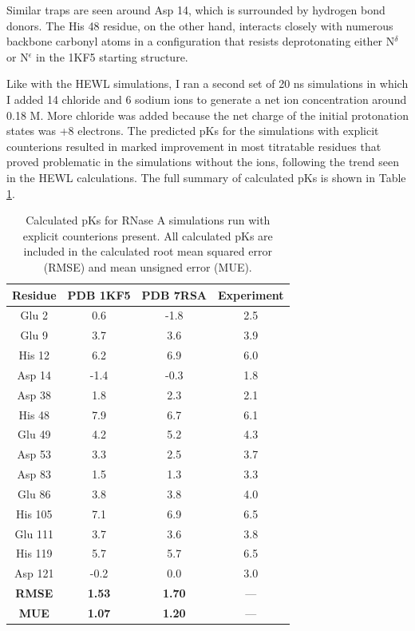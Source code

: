 Similar traps are seen around Asp 14, which is surrounded by hydrogen bond
donors. The His 48 residue, on the other hand, interacts closely with numerous
backbone carbonyl atoms in a configuration that resists deprotonating either
N$^\delta$ or N$^\epsilon$ in the 1KF5 starting structure.

Like with the HEWL simulations, I ran a second set of 20 ns simulations in
which I added 14 chloride and 6 sodium ions to generate a net ion concentration
around 0.18 M. More chloride was added because the net charge of the initial
protonation states was +8 electrons. The predicted pKs for the
simulations with explicit counterions resulted in marked improvement in most
titratable residues that proved problematic in the simulations without the ions,
following the trend seen in the HEWL calculations. The full summary of
calculated pKs is shown in Table \ref{tbl4:rnase_a_ions_pkas}.
\begin{table}
   \caption{Calculated pKs for RNase A simulations run with explicit
            counterions present. All calculated pKs are included in the
            calculated root mean squared error (RMSE) and mean unsigned error
            (MUE).}
   \begin{tabular}{cccc}
      Residue & PDB 1KF5 & PDB 7RSA & Experiment
                               \cite{Baker_ArchBiochemBiophys_1996_v327_p189} \\
      \hline
      Glu 2 & 0.6 & -1.8 & 2.5 \\
      Glu 9 & 3.7 & 3.6 & 3.9 \\
      His 12 & 6.2 & 6.9 & 6.0 \\
      Asp 14 & -1.4 & -0.3 & 1.8 \\
      Asp 38 & 1.8 & 2.3 & 2.1 \\
      His 48 & 7.9 & 6.7 & 6.1 \\
      Glu 49 & 4.2 & 5.2 & 4.3 \\
      Asp 53 & 3.3 & 2.5 & 3.7 \\
      Asp 83 & 1.5 & 1.3 & 3.3 \\
      Glu 86 & 3.8 & 3.8 & 4.0 \\
      His 105 & 7.1 & 6.9 & 6.5 \\
      Glu 111 & 3.7 & 3.6 & 3.8 \\
      His 119 & 5.7 & 5.7 & 6.5 \\
      Asp 121 & -0.2 & 0.0 & 3.0 \\
      \hline
      \hline
      \textbf{RMSE} & \textbf{1.53} & \textbf{1.70} & --- \\
      \textbf{MUE} & \textbf{1.07} & \textbf{1.20} & --- \\
      \hline
   \end{tabular}
   \label{tbl4:rnase_a_ions_pkas}
\end{table}

